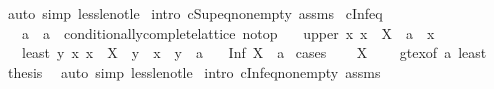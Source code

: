 \begin{isabellebody}
\ {\isacharparenleft}{\kern0pt}auto\ simp{\isacharcolon}{\kern0pt}\ less{\isacharunderscore}{\kern0pt}le{\isacharunderscore}{\kern0pt}not{\isacharunderscore}{\kern0pt}le{\isacharparenright}{\kern0pt}\isanewline
{}\isamarkupfalse%
\ {\isacharparenleft}{\kern0pt}intro\ cSup{\isacharunderscore}{\kern0pt}eq{\isacharunderscore}{\kern0pt}non{\isacharunderscore}{\kern0pt}empty\ assms{\isacharparenright}{\kern0pt}%
\endisatagproof
{\isafoldproof}%
%
\isadelimproof
\isanewline
%
\endisadelimproof
\isanewline
{}\isamarkupfalse%
\ cInf{\isacharunderscore}{\kern0pt}eq{\isacharcolon}{\kern0pt}\isanewline
\ \ \ a\ {\isacharcolon}{\kern0pt}{\isacharcolon}{\kern0pt}\ {\isachardoublequoteopen}{\isacharprime}{\kern0pt}a\ {\isacharcolon}{\kern0pt}{\isacharcolon}{\kern0pt}\ {\isacharbraceleft}{\kern0pt}conditionally{\isacharunderscore}{\kern0pt}complete{\isacharunderscore}{\kern0pt}lattice{\isacharcomma}{\kern0pt}\ no{\isacharunderscore}{\kern0pt}top{\isacharbraceright}{\kern0pt}{\isachardoublequoteclose}\isanewline
\ \ \ upper{\isacharcolon}{\kern0pt}\ {\isachardoublequoteopen}{\isasymAnd}x{\isachardot}{\kern0pt}\ x\ {\isasymin}\ X\ {\isasymLongrightarrow}\ a\ {\isasymle}\ x{\isachardoublequoteclose}\isanewline
\ \ \ least{\isacharcolon}{\kern0pt}\ {\isachardoublequoteopen}{\isasymAnd}y{\isachardot}{\kern0pt}\ {\isacharparenleft}{\kern0pt}{\isasymAnd}x{\isachardot}{\kern0pt}\ x\ {\isasymin}\ X\ {\isasymLongrightarrow}\ y\ {\isasymle}\ x{\isacharparenright}{\kern0pt}\ {\isasymLongrightarrow}\ y\ {\isasymle}\ a{\isachardoublequoteclose}\isanewline
\ \ \ {\isachardoublequoteopen}Inf\ X\ {\isacharequal}{\kern0pt}\ a{\isachardoublequoteclose}\isanewline
%
\isadelimproof
%
\endisadelimproof
%
\isatagproof
{}\isamarkupfalse%
\ cases\isanewline
\ \ \isamarkupfalse%
\ {\isachardoublequoteopen}X\ {\isacharequal}{\kern0pt}\ {\isacharbraceleft}{\kern0pt}{\isacharbraceright}{\kern0pt}{\isachardoublequoteclose}\ \isamarkupfalse%
\ gt{\isacharunderscore}{\kern0pt}ex{\isacharbrackleft}{\kern0pt}of\ a{\isacharbrackright}{\kern0pt}\ least\ \isamarkupfalse%
\ {\isacharquery}{\kern0pt}thesis\ \isamarkupfalse%
\ {\isacharparenleft}{\kern0pt}auto\ simp{\isacharcolon}{\kern0pt}\ less{\isacharunderscore}{\kern0pt}le{\isacharunderscore}{\kern0pt}not{\isacharunderscore}{\kern0pt}le{\isacharparenright}{\kern0pt}\isanewline
{}\isamarkupfalse%
\ {\isacharparenleft}{\kern0pt}intro\ cInf{\isacharunderscore}{\kern0pt}eq{\isacharunderscore}{\kern0pt}non{\isacharunderscore}{\kern0pt}empty\ assms{\isacharparenright}{\kern0pt}%

\end{isabellebody}
